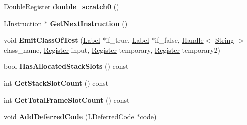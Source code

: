 \begin{DoxyCompactItemize}
\item 
\hyperlink{structv8_1_1internal_1_1_double_register}{Double\+Register} {\bfseries double\+\_\+scratch0} ()\hypertarget{classv8_1_1internal_1_1_l_code_gen_a4f5cc0bfde0e504263fc281ec4150e5c}{}\label{classv8_1_1internal_1_1_l_code_gen_a4f5cc0bfde0e504263fc281ec4150e5c}

\item 
\hyperlink{classv8_1_1internal_1_1_l_instruction}{L\+Instruction} $\ast$ {\bfseries Get\+Next\+Instruction} ()\hypertarget{classv8_1_1internal_1_1_l_code_gen_a3089f4ba7e1cc640f81ca419fb0d39fa}{}\label{classv8_1_1internal_1_1_l_code_gen_a3089f4ba7e1cc640f81ca419fb0d39fa}

\item 
void {\bfseries Emit\+Class\+Of\+Test} (\hyperlink{classv8_1_1internal_1_1_label}{Label} $\ast$if\+\_\+true, \hyperlink{classv8_1_1internal_1_1_label}{Label} $\ast$if\+\_\+false, \hyperlink{classv8_1_1internal_1_1_handle}{Handle}$<$ \hyperlink{classv8_1_1internal_1_1_string}{String} $>$ class\+\_\+name, \hyperlink{structv8_1_1internal_1_1_register}{Register} input, \hyperlink{structv8_1_1internal_1_1_register}{Register} temporary, \hyperlink{structv8_1_1internal_1_1_register}{Register} temporary2)\hypertarget{classv8_1_1internal_1_1_l_code_gen_aae86e9c7161b47dc83e86e0ef0402a43}{}\label{classv8_1_1internal_1_1_l_code_gen_aae86e9c7161b47dc83e86e0ef0402a43}

\item 
bool {\bfseries Has\+Allocated\+Stack\+Slots} () const \hypertarget{classv8_1_1internal_1_1_l_code_gen_a6a5091a94d97298722ad3509d6fa41ab}{}\label{classv8_1_1internal_1_1_l_code_gen_a6a5091a94d97298722ad3509d6fa41ab}

\item 
int {\bfseries Get\+Stack\+Slot\+Count} () const \hypertarget{classv8_1_1internal_1_1_l_code_gen_ae997141e779eee569145e6d5f4326745}{}\label{classv8_1_1internal_1_1_l_code_gen_ae997141e779eee569145e6d5f4326745}

\item 
int {\bfseries Get\+Total\+Frame\+Slot\+Count} () const \hypertarget{classv8_1_1internal_1_1_l_code_gen_a7e0a34008896a2d4d09dab6f216df9cc}{}\label{classv8_1_1internal_1_1_l_code_gen_a7e0a34008896a2d4d09dab6f216df9cc}

\item 
void {\bfseries Add\+Deferred\+Code} (\hyperlink{classv8_1_1internal_1_1_l_deferred_code}{L\+Deferred\+Code} $\ast$code)\hypertarget{classv8_1_1internal_1_1_l_code_gen_a136807d3acd05ca71821c19ab49ef581}{}\label{classv8_1_1internal_1_1_l_code_gen_a136807d3acd05ca71821c19ab49ef581}


\end{DoxyCompactItemize}
